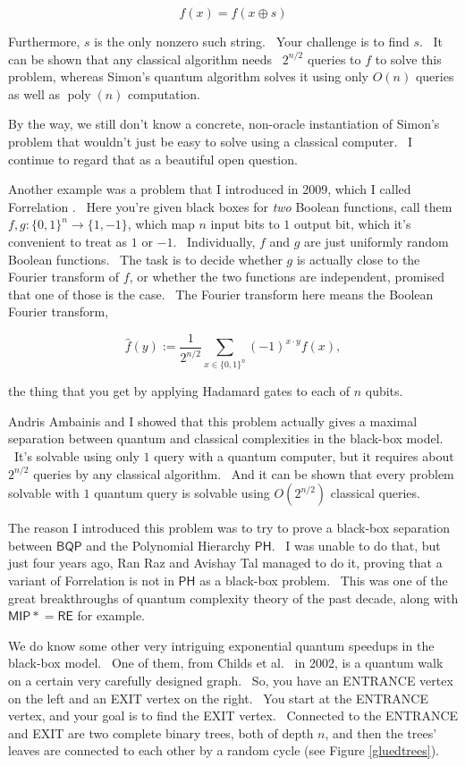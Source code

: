 \documentclass[12pt]{article}
\begin{document}
$$f(x) = f(x\oplus s)$$

\noindent Furthermore, $s$ is the only nonzero such string. \ Your challenge is to find $s$. \ It can be shown that any classical algorithm needs ~$2^{n/2}$ queries to $f$ to solve this problem, whereas Simon's quantum algorithm solves it using only $O(n)$ queries as well as $\operatorname{poly}(n)$ computation.

By the way, we still don't know a concrete, non-oracle instantiation of Simon's problem that wouldn't just be easy to solve using a classical computer. \ I continue to regard that as a beautiful open question.

Another example was a problem that I introduced in 2009, which I called Forrelation \cite{aar:ph}. \ Here you're given black boxes for \emph{two} Boolean functions, call them $f,g: \{0,1\}^n \rightarrow \{1,-1\}$, which map $n$ input bits to $1$ output bit, which it's convenient to treat as $1$ or $-1$. \ Individually, $f$ and $g$ are just uniformly random Boolean functions. \ The task is to decide whether $g$ is actually close to the Fourier transform of $f$, or whether the two functions are independent, promised that one of those is the case. \ The Fourier transform here means the Boolean Fourier transform,

$$\hat{f}(y) := \frac{1}{2^{n/2}} \sum_{x \in \{0,1\}^n} (-1)^{x\cdot y}f(x),$$

\noindent the thing that you get by applying Hadamard gates to each of $n$ qubits.

Andris Ambainis and I \cite{aa:for} showed that this problem actually gives a maximal separation between quantum and classical complexities in the black-box model. \ It's solvable using only $1$ query with a quantum computer, but it requires about $2^{n/2}$ queries by any classical algorithm. \ And it can be shown that every problem solvable with $1$ quantum query is solvable using $O(2^{n/2})$ classical queries.

The reason I introduced this problem was to try to prove a black-box separation between $\mathsf{BQP}$ and the Polynomial Hierarchy $\mathsf{PH}$. \ I was unable to do that, but just four years ago, Ran Raz and Avishay Tal \cite{raztal} managed to do it, proving that a variant of Forrelation is not in $\mathsf{PH}$ as a black-box problem. \ This was one of the great breakthroughs of quantum complexity theory of the past decade, along with $\mathsf{MIP*} = \mathsf{RE}$ \cite{mipre} for example.

We do know some other very intriguing exponential quantum speedups in the black-box model. \ One of them, from Childs et al.\ \cite{ccdfgs} in 2002, is a quantum walk on a certain very carefully designed graph. \ So, you have an ENTRANCE vertex on the left and an EXIT vertex on the right. \ You start at the ENTRANCE vertex, and your goal is to find the EXIT vertex. \ Connected to the ENTRANCE and EXIT are two complete binary trees, both of depth $n$, and then the trees' leaves are connected to each other by a random cycle (see Figure \ref{gluedtrees}).
\end{document}
